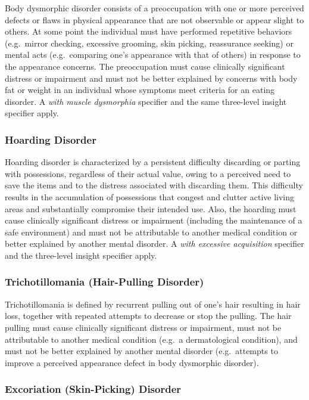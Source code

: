 Body dysmorphic disorder consists of a preoccupation with one or more perceived
defects or flaws in physical appearance that are not observable or appear slight
to others. At some point the individual must have performed repetitive behaviors
(e.g.\ mirror checking, excessive grooming, skin picking, reassurance seeking) or
mental acts (e.g.\ comparing one's appearance with that of others) in response to
the appearance concerns. The preoccupation must cause clinically significant
distress or impairment and must not be better explained by concerns with body fat
or weight in an individual whose symptoms meet criteria for an eating disorder. A
\emph{with muscle dysmorphia} specifier and the same three-level insight specifier
apply.

\subsubsection{Hoarding Disorder}

Hoarding disorder is characterized by a persistent difficulty discarding or
parting with possessions, regardless of their actual value, owing to a perceived
need to save the items and to the distress associated with discarding them. This
difficulty results in the accumulation of possessions that congest and clutter
active living areas and substantially compromise their intended use. Also, the hoarding must cause clinically significant distress or impairment (including the
maintenance of a safe environment) and must not be attributable to another
medical condition or better explained by another mental disorder. A \emph{with
excessive acquisition} specifier and the three-level insight specifier apply.

\subsubsection{Trichotillomania (Hair-Pulling Disorder)}

Trichotillomania is defined by recurrent pulling out of one's hair resulting in
hair loss, together with repeated attempts to decrease or stop the pulling. The
hair pulling must cause clinically significant distress or impairment, must not
be attributable to another medical condition (e.g.\ a dermatological condition),
and must not be better explained by another mental disorder (e.g.\ attempts to
improve a perceived appearance defect in body dysmorphic disorder).

\subsubsection{Excoriation (Skin-Picking) Disorder}

